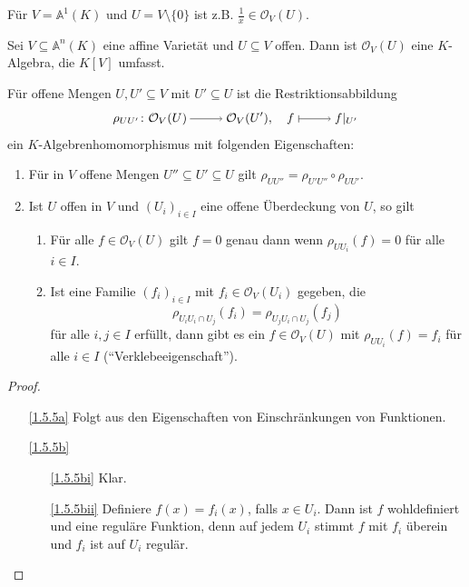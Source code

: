 \documentclass[a4paper,12pt,index=toc]{scrbook}
\theoremstyle{keinenummern} %
\def\A{\mathbb{A}}
\def\O{\mathcal{O}}
\newcommand{\restrict}[1]{|_{#1}}
\begin{document}
\begin{nbsp}
  Für $V=\A^1(K)$ und $U=V\setminus\{0\}$ ist z.B. $\frac1x\in\O_V(U)$.
\end{nbsp}

\begin{bem}\label{1.5.4}
  Sei $V\subseteq\A^n(K)$ eine affine Varietät und $U\subseteq V$ offen. Dann ist $\O_V(U)$ eine $K$-Algebra, die $K[V]$
  umfasst.
\end{bem}

\begin{bem}\label{1.5.5}
  Für offene Mengen $U,U'\subseteq V$ mit $U'\subseteq U$ ist die Restriktionsabbildung
  \[ \rho_{UU'}\colon \O_V(U)\ra\O_V(U'),\quad f\mapsto f\restrict{U'} \]
  ein $K$-Algebrenhomomorphismus mit folgenden Eigenschaften:
  \begin{enumerate}
  \item{} Für in $V$ offene Mengen $U''\subseteq U'\subseteq U$ gilt $\rho_{UU''}=\rho_{U'U''}\circ\rho_{UU'}$.
  \item{} Ist $U$ offen in $V$ und $(U_i)_{i\in I}$ eine offene Überdeckung von $U$, so gilt
    \begin{enumerate}
    \item{} Für alle $f\in\O_V(U)$ gilt $f=0$ genau dann wenn $\rho_{UU_i}(f)=0$ für alle $i\in I$.
    \item{} Ist eine Familie $(f_i)_{i\in I}$ mit $f_i\in\O_V(U_i)$ gegeben, die 
    \[\rho_{U_iU_i\cap U_j}(f_i)=\rho_{U_jU_i\cap U_j}(f_j)\]
      für alle $i,j\in I$ erfüllt, dann gibt es ein $f\in\O_V(U)$ mit
      $\rho_{UU_i}(f)=f_i$ für alle $i\in I$
      (\enquote{Verklebeeigenschaft}).
    \end{enumerate}
  \end{enumerate}
\end{bem}
\begin{proof}
  \begin{enumerate}
  \item[\ref{1.5.5a}] Folgt aus den Eigenschaften von Einschränkungen von Funktionen.
  \item[\ref{1.5.5b}]
    \begin{enumerate}
    \item[\ref{1.5.5bi}] Klar.
    \item[\ref{1.5.5bii}] Definiere $f(x)=f_i(x)$, falls $x\in U_i$. Dann ist $f$ wohldefiniert und eine reguläre Funktion, denn
      auf jedem $U_i$  stimmt $f$ mit $f_i$ überein und $f_i$ ist auf $U_i$ regulär.
    \end{enumerate}
  \end{enumerate}
\end{proof}
\end{document}
